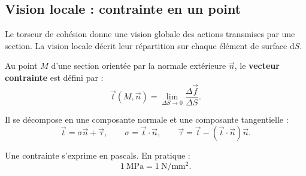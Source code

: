 \subsection{Vision locale : contrainte en un point}

Le torseur de cohésion donne une vision globale des actions transmises par une section. La vision locale décrit leur répartition sur chaque élément de surface $\mathrm dS$.

Au point $M$ d'une section orientée par la normale extérieure $\vec n$, le \textbf{vecteur contrainte} est défini par :
\[
\vec t(M,\vec n)=\lim_{\Delta S\to0}\frac{\Delta\vec f}{\Delta S}.
\]

Il se décompose en une composante normale et une composante tangentielle :
\[
\vec t=\sigma\vec n+\vec\tau,
\qquad
\sigma=\vec t\cdot\vec n,
\qquad
\vec\tau=\vec t-(\vec t\cdot\vec n)\vec n.
\]

\TLRDMVecteurContrainte

Une contrainte s'exprime en pascals. En pratique :
\[
\boxed{1\ \mathrm{MPa}=1\ \mathrm{N/mm^2}.}
\]
